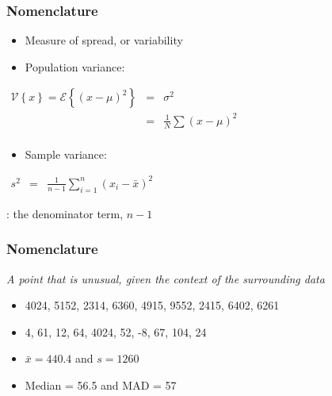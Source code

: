 \begin{frame}\frametitle{Nomenclature}
	{}
	\begin{itemize}
		\item	Measure of spread, or variability
		\item	Population variance:
	\end{itemize}

	$
	\begin{array}{rcl}
		\mathcal{V}\left\{x\right\} = \mathcal{E}\left\{ (x - \mu )^2\right\} &=& \sigma^2 \\
		&=& \displaystyle \frac{1}{N}\sum{(x-\mu)^2} \\
	\end{array}
	$
	\begin{itemize}
		\item	Sample variance:
	\end{itemize}
	$
	\begin{array}{rcl}
		s^2 &=& \displaystyle \frac{1}{n-1}\sum_{i=1}^{n}{(x_i - \bar{x})^2}
	\end{array}
	$

	{}: the denominator term, $n-1$
\end{frame}

\begin{frame}\frametitle{Nomenclature}
	\begin{block}
		{}
		\begin{center}
			\emph{A point that is unusual, given the context of the surrounding data}
		\end{center}
	\end{block}
	\begin{itemize}
		\item	4024, 5152, 2314, 6360, 4915, 9552, 2415, 6402, 6261
		\item	4, 61, 12, 64, 4024, 52, -8, 67, 104, 24
	\end{itemize}
	
	\vspace{12pt}
	\begin{itemize}
		\item	$\bar{x} = 440.4$  and $s = 1260$
		\item	Median = 56.5 and MAD = 57
	\end{itemize}
\end{frame}

